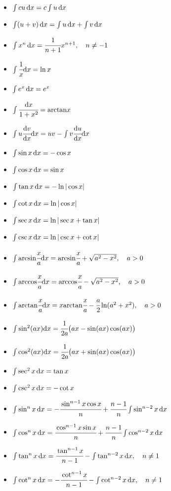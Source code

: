\begin{itemize}
\item $ \int c u \,{ { \text{d} } x} = c \int u \,{ { \text{d} } x}$
\item $ \int (u + v) \,{ { \text{d} } x} = \int u \,{ { \text{d} } x} + \int v \,{ { \text{d} } x}$
\item $ \int x^n \,{ { \text{d} } x} = \cfrac{1}{n + 1}x^{n+1}, \quad n \neq -1$
\item $ \int \cfrac{1}{x}{ { \text{d} } x} = \ln x$
\item $ \int e^x \,{ { \text{d} } x} = e^x$
\item $ \int \cfrac{{ { \text{d} } x}}{1 + x ^ 2} = { \mathop{\text{arctan}} } x$
\item $ \int u \cfrac{{ { \text{d} } v }}{{ { \text{d} } x}} { { \text{d} } x} = uv - \int v \cfrac{{ { \text{d} } u }}{{ { \text{d} } x}} { { \text{d} } x}$
\item $ \int \sin x \,{ { \text{d} } x} = -\cos x$
\item $ \int \cos x \,{ { \text{d} } x} = \sin x$
\item $ \int \tan x \,{ { \text{d} } x} = -\ln \vert \cos x \vert$
\item $ \int \cot x \,{ { \text{d} } x} = \ln \vert \cos x \vert$
\item $ \int \sec x \,{ { \text{d} } x} = \ln \vert \sec x + \tan x \vert$
\item $ \int \csc x \,{ { \text{d} } x} = \ln \vert \csc x + \cot x \vert$
\item $ \int { \mathop{\text{arcsin}} } \cfrac{x}{a} { { \text{d} } x} = { \mathop{\text{arcsin}} } \cfrac{x}{a} + \sqrt{a^2 - x^2}, \quad \hbox{$a > 0$}$
\item $ \int { \mathop{\text{arccos}} } \cfrac{x}{a} { { \text{d} } x} = { \mathop{\text{arccos}} } \cfrac{x}{a} - \sqrt{a^2 - x^2}, \quad \hbox{$a > 0$}$
\item $ \int { \mathop{\text{arctan}} } \cfrac{x}{a} { { \text{d} } x} = x { \mathop{\text{arctan}} } \cfrac{x}{a} - \cfrac{a}{2} \ln(a^2 + x^2), \quad \hbox{$a > 0$}$
\item $ \int \sin^2 (a x) { { \text{d} } x} = \cfrac{1}{2a} \big(ax - \sin(ax) \cos(ax)\big)$
\item $ \int \cos^2 (a x) { { \text{d} } x} = \cfrac{1}{2a} \big(ax + \sin(ax) \cos(ax)\big)$
\item $ \int \sec^2 x \, { { \text{d} } x} = \tan x$
\item $ \int \csc^2 x \, { { \text{d} } x} = - \cot x$
\item $ \int \sin^n x \, { { \text{d} } x} = -\cfrac{\sin^{n-1} x \cos x}{n} + \cfrac{n-1}{n}\int \sin^{n-2} x \, { { \text{d} } x}$
\item $ \int \cos^n x \, { { \text{d} } x} = \cfrac{\cos^{n-1} x \sin x}{n} + \cfrac{n-1}{n}\int \cos^{n-2} x \, { { \text{d} } x}$
\item $ \int \tan^n x \, { { \text{d} } x} = \cfrac{\tan^{n-1} x }{n - 1} - \int \tan^{n-2} x \, { { \text{d} } x},\quad n \neq 1$
\item $ \int \cot^n x \, { { \text{d} } x} = -\cfrac{\cot^{n-1} x}{n - 1} - \int \cot^{n-2} x \, { { \text{d} } x},\quad n \neq 1$

\end{itemize}
